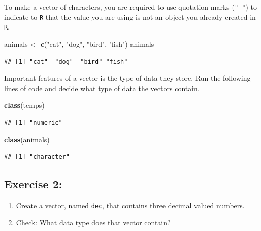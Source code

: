 \documentclass[
  10pt,
  letterpaper,
  twoside,
  openright]{book}
\newenvironment{Shaded}{\begin{snugshade}}{\end{snugshade}}
\newcommand{\FunctionTok}[1]{\textcolor[rgb]{0.13,0.29,0.53}{\textbf{#1}}}
\newcommand{\NormalTok}[1]{#1}
\newcommand{\OtherTok}[1]{\textcolor[rgb]{0.56,0.35,0.01}{#1}}
\newcommand{\StringTok}[1]{\textcolor[rgb]{0.31,0.60,0.02}{#1}}
\begin{document}
To make a vector of characters, you are required to use quotation marks
(\texttt{"\ "}) to indicate to \texttt{R} that the value you are using
is not an object you already created in \texttt{R}.

\begin{Shaded}
\begin{Highlighting}[]
\NormalTok{animals }\OtherTok{\textless{}{-}} \FunctionTok{c}\NormalTok{(}\StringTok{"cat"}\NormalTok{, }\StringTok{"dog"}\NormalTok{, }\StringTok{"bird"}\NormalTok{, }\StringTok{"fish"}\NormalTok{)}
\NormalTok{animals}
\end{Highlighting}
\end{Shaded}

\begin{verbatim}
## [1] "cat"  "dog"  "bird" "fish"
\end{verbatim}

Important features of a vector is the type of data they store. Run the
following lines of code and decide what type of data the vectors
contain.

\begin{Shaded}
\begin{Highlighting}[]
\FunctionTok{class}\NormalTok{(temps)}
\end{Highlighting}
\end{Shaded}

\begin{verbatim}
## [1] "numeric"
\end{verbatim}

\begin{Shaded}
\begin{Highlighting}[]
\FunctionTok{class}\NormalTok{(animals)}
\end{Highlighting}
\end{Shaded}

\begin{verbatim}
## [1] "character"
\end{verbatim}

\hypertarget{exercise-2}{%
\subsection{Exercise 2:}\label{exercise-2}}

\begin{enumerate}
\def\labelenumi{\arabic{enumi}.}
\item
  Create a vector, named \texttt{dec}, that contains three decimal
  valued numbers.
\item
  Check: What data type does that vector contain?
\end{enumerate}
\end{document}
